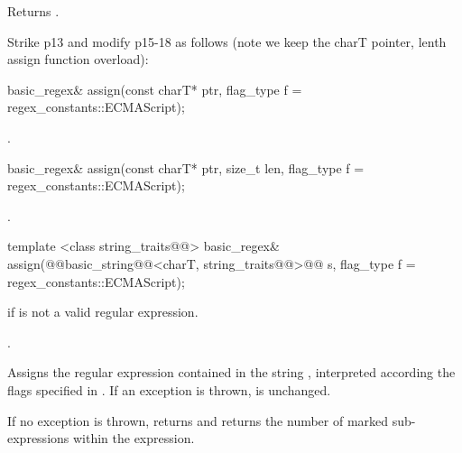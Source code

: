 \documentclass[ebook,11pt,article]{memoir}
\begin{document}
\begin{itemdescr}
\pnum
\effects Returns .
\end{itemdescr}

Strike p13 and modify p15-18 as follows (note we keep the charT pointer, lenth assign function overload):
\begin{removedblock}
\begin{itemdecl}
basic_regex& assign(const charT* ptr, flag_type f = regex_constants::ECMAScript); 
\end{itemdecl}

\begin{itemdescr}
\pnum
\returns  {}.
\end{itemdescr}
\end{removedblock}
\begin{itemdecl}
basic_regex& assign(const charT* ptr, size_t len,
  flag_type f = regex_constants::ECMAScript);
\end{itemdecl}

\begin{itemdescr}
\pnum
\returns {}.
\end{itemdescr}

\begin{itemdecl}
template <class string_traits@@>
  basic_regex& assign(@@basic_string@@<charT, string_traits@@>@\del{\&}@ s,
                      flag_type f = regex_constants::ECMAScript); 
\end{itemdecl}

\begin{itemdescr}
\pnum
\throws  {} if  is not a valid regular expression. 

\pnum
\returns  {}.

\pnum
\effects  Assigns the regular expression contained in the string 
, interpreted according the flags specified in . 
If an exception is thrown,  is unchanged.  

\pnum
\postconditions
If no exception is thrown,
 returns  and 
returns the number of marked sub-expressions within the expression.
\end{itemdescr}
\end{document}
